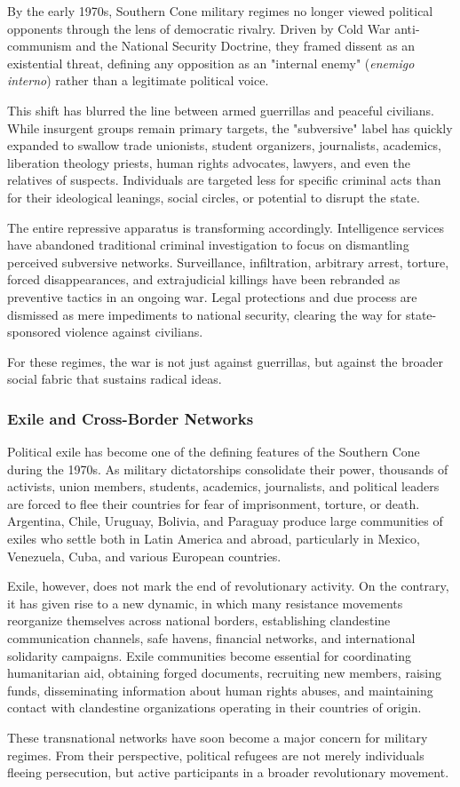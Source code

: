 By the early 1970s, Southern Cone military regimes no longer viewed political opponents through the lens of democratic rivalry. Driven by Cold War anti-communism and the National Security Doctrine, they framed dissent as an existential threat, defining any opposition as an "internal enemy" (\emph{enemigo interno}) rather than a legitimate political voice.

This shift has blurred the line between armed guerrillas and peaceful civilians. While insurgent groups remain primary targets, the "subversive" label has quickly expanded to swallow trade unionists, student organizers, journalists, academics, liberation theology priests, human rights advocates, lawyers, and even the relatives of suspects. Individuals are targeted less for specific criminal acts than for their ideological leanings, social circles, or potential to disrupt the state.

The entire repressive apparatus is transforming accordingly. Intelligence services have abandoned traditional criminal investigation to focus on dismantling perceived subversive networks. Surveillance, infiltration, arbitrary arrest, torture, forced disappearances, and extrajudicial killings have been rebranded as preventive tactics in an ongoing war. Legal protections and due process are dismissed as mere impediments to national security, clearing the way for state-sponsored violence against civilians.

For these regimes, the war is not just against guerrillas, but against the broader social fabric that sustains radical ideas.

\subsubsection{Exile and Cross-Border Networks}

Political exile has become one of the defining features of the Southern Cone during the 1970s. As military dictatorships consolidate their power, thousands of activists, union members, students, academics, journalists, and political leaders are forced to flee their countries for fear of imprisonment, torture, or death. Argentina, Chile, Uruguay, Bolivia, and Paraguay produce large communities of exiles who settle both in Latin America and abroad, particularly in Mexico, Venezuela, Cuba, and various European countries.

Exile, however, does not mark the end of revolutionary activity. On the contrary, it has given rise to a new dynamic, in which many resistance movements reorganize themselves across national borders, establishing clandestine communication channels, safe havens, financial networks, and international solidarity campaigns. Exile communities become essential for coordinating humanitarian aid, obtaining forged documents, recruiting new members, raising funds, disseminating information about human rights abuses, and maintaining contact with clandestine organizations operating in their countries of origin.

These transnational networks have soon become a major concern for military regimes. From their perspective, political refugees are not merely individuals fleeing persecution, but active participants in a broader revolutionary movement.
